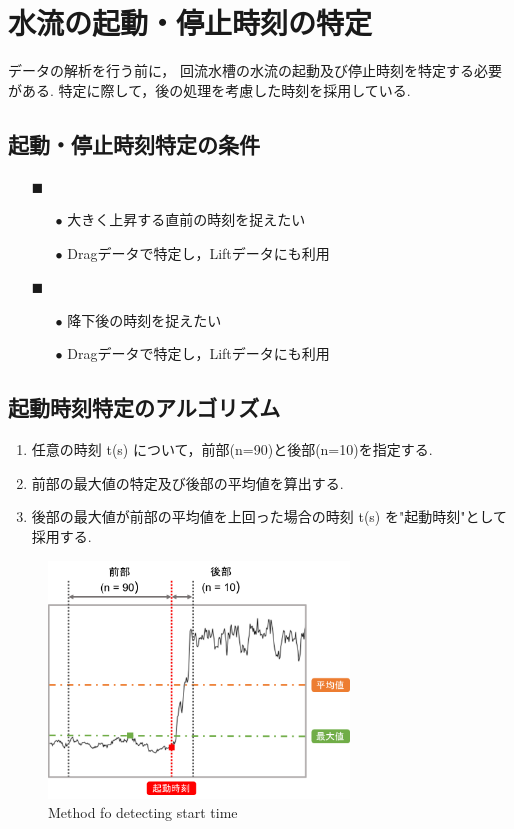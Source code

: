 \documentclass[twocolumn,a4j]{jsarticle}
\begin{document}
\section{水流の起動・停止時刻の特定}
データの解析を行う前に，
回流水槽の水流の起動及び停止時刻を特定する必要がある.
特定に際して，後の処理を考慮した時刻を採用している.

\subsection{起動・停止時刻特定の条件}
\begin{itemize}
    \item [$\blacksquare$] 
        \begin{itemize}
            \item [$\bullet$] 大きく上昇する直前の時刻を捉えたい
            \item [$\bullet$] Dragデータで特定し，Liftデータにも利用
        \end{itemize}
    \item [$\blacksquare$] 
        \begin{itemize}
            \item [$\bullet$] 降下後の時刻を捉えたい
            \item [$\bullet$] Dragデータで特定し，Liftデータにも利用
        \end{itemize}
\end{itemize}
\subsection{起動時刻特定のアルゴリズム}
\begin{enumerate}[(1)]
    \item 任意の時刻 t(s) について，前部(n=90)と後部(n=10)を指定する.
    \item 前部の最大値の特定及び後部の平均値を算出する.
    \item 後部の最大値が前部の平均値を上回った場合の時刻 t(s) を"起動時刻"として採用する.
\end{enumerate}
\begin{figure}[htbp]
    \footnotesize
    \begin{center}
        \includegraphics[width=80mm]{images/start.png}
        \caption{Method fo detecting start time}
    \end{center}
\end{figure}
\end{document}
